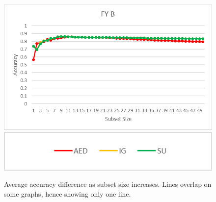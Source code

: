 \begin{figure}[h]
\begin{center}
\includegraphics[scale=0.25]{Graphs/AccuracyDifference/FY_B}
\includegraphics[scale=0.5]{Graphs/legendNokNN}
\caption{Average accuracy difference as subset size increases. Lines overlap on some graphs, hence showing only one line.}
\label{fig:accuracyDifference}
\end{center}
\end{figure}

